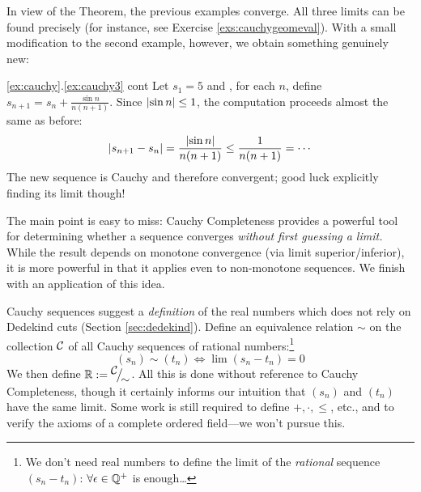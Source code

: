 In view of the Theorem, the previous examples converge. All three limits can be found precisely (for instance, see Exercise \ref{exs:cauchygeomeval}). With a small modification to the second example, however, we obtain something genuinely new:

\begin{example*}{\ref*{ex:cauchy}.\ref{ex:cauchy3} cont}{}
Let $s_1=5$ and , for each $n$, define $s_{n+1}=s_n+\frac{\sin n}{n(n+1)}$. Since $\left| \sin n\right|\le 1$, the computation proceeds almost the same as before:
\[\left| s_{n+1}-s_n\right|=\frac{\left| \sin n\right|}{n(n+1)}\le \frac 1{n(n+1)}=\cdots\]
The new sequence is Cauchy and therefore convergent; good luck explicitly finding its limit though!
\end{example*}

The main point is easy to miss: Cauchy Completeness provides a powerful tool for determining whether a sequence converges \emph{without first guessing a limit.} While the result depends on monotone convergence (via limit superior/inferior), it is more powerful in that it applies even to non-monotone sequences. We finish with an application of this idea.




Cauchy sequences suggest a \emph{definition} of the real numbers which does not rely on Dedekind cuts (Section \ref{sec:dedekind}).\smallbreak
Define an equivalence relation $\sim$ on the collection $\mathcal{C}$ of all Cauchy sequences of rational numbers:\footnote{We don't need real numbers to define the limit of the \emph{rational} sequence $(s_n-t_n)$: $\forall \epsilon\in\mathbb{Q}^+$ is enough\ldots}
\[(s_n)\sim(t_n)\iff \lim(s_n-t_n)=0\]
We then define $\mathbb{R}:={}^{\textstyle {\mathcal{C}}}\!\big/_{\textstyle \!{\sim}}$. All this is done without reference to Cauchy Completeness, though it certainly informs our intuition that $(s_n)$ and $(t_n)$ have the same limit. Some work is still required to define $+,\cdot,\le$, etc., and to verify the axioms of a complete ordered field---we won't pursue this.

\goodbreak

